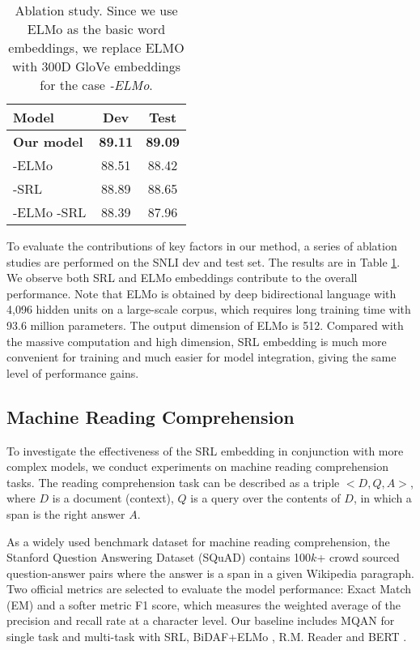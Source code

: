 \documentclass[11pt]{article}
\begin{document}
\begin{table}
	\centering
	{
		\begin{tabular}{l c c}
			\hline
			
			\hline
			Model& Dev & Test\\
			\hline
			\textbf{Our model} &\textbf{89.11} & \textbf{89.09} \\
			\hline
			-ELMo & 88.51   & 88.42 \\
			-SRL &  88.89   &  88.65 \\	
			-ELMo -SRL &  88.39  & 87.96 \\
			\hline
			
			\hline
		\end{tabular}
	}
	
	\caption{\label{tab:ablation} Ablation study. Since we use ELMo as the basic word embeddings, we replace ELMO with 300D GloVe embeddings for the case \emph{-ELMo}.}
\end{table}
To evaluate the contributions of key factors in our
method, a series of ablation studies are performed
on the SNLI dev and test set. The results are in Table \ref{tab:ablation}. We observe both SRL and ELMo embeddings contribute to the overall performance. Note that ELMo is obtained by deep bidirectional language with 4,096 hidden units on a large-scale corpus, which requires long training time with 93.6 million parameters. The output dimension of ELMo is 512. Compared with the massive computation and high dimension, SRL embedding is much more convenient for training and much easier for model integration, giving the same level of performance gains.

\subsection{Machine Reading Comprehension} 

To investigate the effectiveness of the SRL embedding in conjunction with more complex models, we conduct experiments on machine reading comprehension tasks. The reading comprehension task can be described as a triple $<D, Q, A>$, where $D$ is a document (context), $Q$ is a query over the contents of $D$, in which a span is the right answer $A$.  

As a widely used benchmark dataset for machine reading comprehension, the Stanford Question Answering Dataset (SQuAD) \citep{Rajpurkar2016SQuAD} contains 100$k$+ crowd sourced question-answer pairs where the answer is a span in a given Wikipedia paragraph. Two official metrics are selected to evaluate the model performance: Exact Match (EM) and a softer metric F1 score, which measures the weighted average of the precision and recall rate at a character level. Our baseline includes MQAN \citep{Mccann2018The} for single task and multi-task with SRL, BiDAF+ELMo \citep{Peters2018ELMO}, R.M. Reader and BERT \citep{devlin2018bert}.
\end{document}
